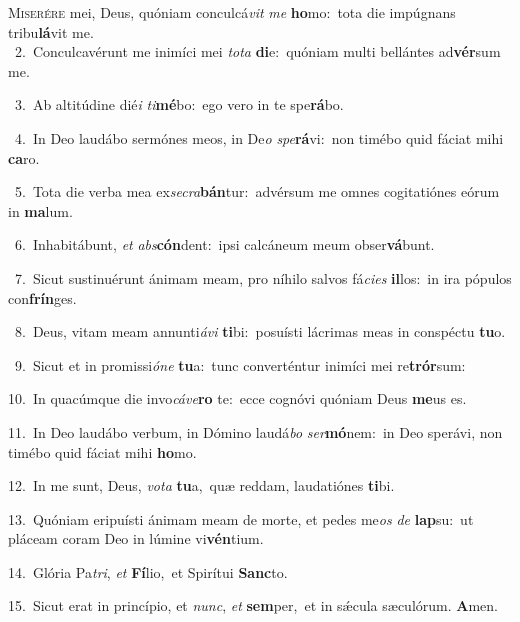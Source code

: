 \lettrine{\initial\textcolor{\initialcolor}{M}}{iserére} mei, Deus, quóniam conculcá\textit{vit} \textit{me} \textbf{ho}\-mo:~\star tota die impúgnans tribu\-\textbf{lá}\-vit me.\\
{\numbfont\textcolor{\numbcolor}{~2.}}~Conculcavérunt me inimíci mei \textit{to}\-\textit{ta} \textbf{di}\-e:~\star quóniam multi bellántes ad\-\textbf{vér}\-sum me.\par
{\numbfont\textcolor{\numbcolor}{~3.}}~Ab altitúdine dié\textit{i} \textit{ti}\-\textbf{mé}bo:~\star ego vero in te spe\-\textbf{rá}\-bo.\par
{\numbfont\textcolor{\numbcolor}{~4.}}~In Deo laudábo sermónes meos, in De\textit{o} \textit{spe}\-\textbf{rá}vi:~\star non timébo quid fáciat mihi \textbf{ca}\-ro.\par
{\numbfont\textcolor{\numbcolor}{~5.}}~Tota die verba mea ex\-\textit{se}\-\textit{cra}\textbf{bán}tur:~\star advérsum me omnes cogitatiónes eórum in \textbf{ma}\-lum.\par
{\numbfont\textcolor{\numbcolor}{~6.}}~Inhabitábunt, \textit{et} \textit{abs}\-\textbf{cón}dent:~\star ipsi calcáneum meum obser\-\textbf{vá}\-bunt.\par
{\numbfont\textcolor{\numbcolor}{~7.}}~Sicut sustinuérunt ánimam meam, pro níhilo salvos fá\-\textit{ci}\-\textit{es} \textbf{il}\-los:~\star in ira pópulos con\-\textbf{frín}\-ges.\par
{\numbfont\textcolor{\numbcolor}{~8.}}~Deus, vitam meam annunti\-\textit{á}\-\textit{vi} \textbf{ti}\-bi:~\star posuísti lácrimas meas in conspéctu \textbf{tu}\-o.\par
{\numbfont\textcolor{\numbcolor}{~9.}}~Sicut et in promissi\-\textit{ó}\-\textit{ne} \textbf{tu}\-a:~\star tunc converténtur inimíci mei re\-\textbf{trór}\-sum:\par
{\numbfont\textcolor{\numbcolor}{10.}}~In quacúmque die invo\-\textit{cá}\-\textit{ve}\textbf{ro} te:~\star ecce cognóvi quóniam Deus \textbf{me}\-us es.\par
{\numbfont\textcolor{\numbcolor}{11.}}~In Deo laudábo verbum, in Dómino laudá\textit{bo} \textit{ser}\-\textbf{mó}nem:~\star in Deo sperávi, non timébo quid fáciat mihi \textbf{ho}\-mo.\par
{\numbfont\textcolor{\numbcolor}{12.}}~In me sunt, Deus, \textit{vo}\-\textit{ta} \textbf{tu}\-a,~\star quæ reddam, laudatiónes \textbf{ti}\-bi.\par
{\numbfont\textcolor{\numbcolor}{13.}}~Quóniam eripuísti ánimam meam de morte, et pedes me\textit{os} \textit{de} \textbf{lap}\-su:~\star ut pláceam coram Deo in lúmine vi\-\textbf{vén}\-tium.\par
{\numbfont\textcolor{\numbcolor}{14.}}~Glória Pa\-\textit{tri}\-, \textit{et} \textbf{Fí}\-lio,~\star et Spirítui \textbf{Sanc}\-to.\par
{\numbfont\textcolor{\numbcolor}{15.}}~Sicut erat in princípio, et \textit{nunc}\-, \textit{et} \textbf{sem}\-per,~\star et in sǽcula sæculórum. \textbf{A}\-men.\par
